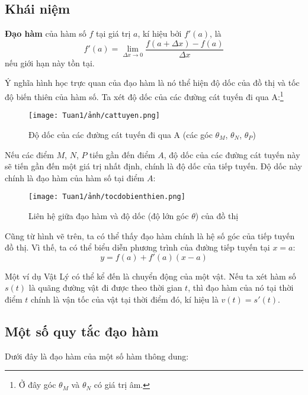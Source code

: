 \subsection{Khái niệm}
\begin{definition}
\textbf{Đạo hàm} của hàm số $f$ tại giá trị $a$, kí hiệu bởi $f'(a)$, là
    \begin{equation}
        f'(a)=\lim_{\Delta x\rightarrow 0}\frac{f(a+\Delta x)-f(a)}{\Delta x}
    \end{equation}
nếu giới hạn này tồn tại.
\end{definition}

Ý nghĩa hình học trực quan của đạo hàm là nó thể hiện độ dốc của đồ thị và tốc độ biến thiên của hàm số. Ta xét độ dốc của các đường cát tuyến đi qua A:\footnote{Ở đây góc $\theta_M$ và $\theta_N$ có giá trị âm.}
\begin{figure}[H]
\centering 
\texttt{[image: Tuan1/ảnh/cattuyen.png]}
\caption{Độ dốc của các đường cát tuyến đi qua A (các góc $\theta_M$, $\theta_N$, $\theta_P$)}
\end{figure}

Nếu các điểm $M$, $N$, $P$ tiến gần đến điểm $A$, độ dốc của các đường cát tuyến này sẽ tiến gần đến một giá trị nhất định, chính là độ dốc của tiếp tuyến. Độ dốc này chính là đạo hàm của hàm số tại điểm $A$:
\begin{figure}[H]
\centering
\texttt{[image: Tuan1/ảnh/tocdobienthien.png]}
\caption{Liên hệ giữa đạo hàm và độ dốc (độ lớn góc $\theta$) của đồ thị}
\end{figure}

Cũng từ hình vẽ trên, ta có thể thấy đạo hàm chính là hệ số góc của tiếp tuyến đồ thị. Vì thế, ta có thể biểu diễn phương trình của đường tiếp tuyến tại $x=a$:
\begin{equation}
    y=f(a)+f'(a)(x-a)
\end{equation}

Một ví dụ Vật Lý có thể kể đến là chuyển động của một vật. Nếu ta xét hàm số $s(t)$ là quãng đường vật đi được theo thời gian $t$, thì đạo hàm của nó tại thời điểm $t$ chính là vận tốc của vật tại thời điểm đó, kí hiệu là $v(t)=s'(t)$.

\subsection{Một số quy tắc đạo hàm}
Dưới đây là đạo hàm của một số hàm thông dung:

